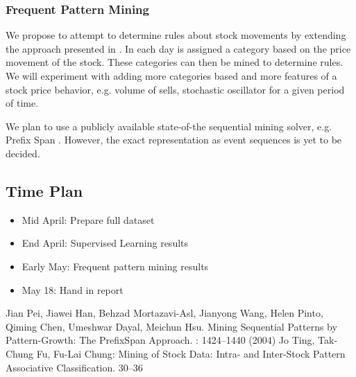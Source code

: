 \documentclass[11pt]{article}
\begin{document}
\vspace{-5pt}
\subsubsection*{Frequent Pattern Mining }

We propose to attempt to determine rules about stock movements by extending the
approach presented in \cite{fpstock}. In \cite{fpstock} each day is assigned a
category based on the price movement of the stock. These categories can then be
mined to determine rules. We will experiment with adding more categories based and more features of a stock price behavior, e.g. volume of sells, stochastic oscillator for a given period of time.

 
We plan to use a  publicly available state-of-the sequential mining solver, e.g. Prefix Span \cite{prefixspan}. However, the exact representation as event sequences is yet to be decided.

\vspace{-10pt}
\subsection*{Time Plan}
\begin{itemize}
    \setlength{\itemsep}{1pt}
    \setlength{\parskip}{0pt}
    \setlength{\parsep}{0pt}
    \item Mid April: Prepare full dataset
    \item End April: Supervised Learning results
    \item Early May: Frequent pattern mining results
    \item May 18: Hand in report
\end{itemize}

\begin{thebibliography}{1}
Jian Pei, Jiawei Han, Behzad Mortazavi-Asl, Jianyong Wang, Helen Pinto, Qiming Chen, Umeshwar Dayal, Meichun Hsu. 
\newblock Mining Sequential Patterns by Pattern-Growth: The PrefixSpan Approach. 
: 1424--1440 (2004)
Jo Ting, Tak-Chung Fu, Fu-Lai Chung: 
\newblock Mining of Stock Data: Intra- and Inter-Stock Pattern Associative Classification.  30--36
\end{thebibliography}
\end{document}
